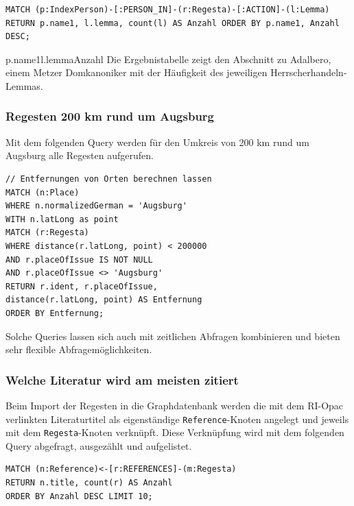 \begin{verbatim}
MATCH (p:IndexPerson)-[:PERSON_IN]-(r:Regesta)-[:ACTION]-(l:Lemma)
RETURN p.name1, l.lemma, count(l) AS Anzahl ORDER BY p.name1, Anzahl DESC;
\end{verbatim}

\textbar p.name1\textbar l.lemma\textbar Anzahl\textbar{} Die
Ergebnistabelle zeigt den Abschnitt zu Adalbero, einem Metzer
Domkanoniker mit der Häufigkeit des jeweiligen Herrscherhandeln-Lemmas.

\hypertarget{regesten-200-km-rund-um-augsburg}{%
\subsubsection{Regesten 200 km rund um
Augsburg}\label{regesten-200-km-rund-um-augsburg}}

Mit dem folgenden Query werden für den Umkreis von 200 km rund um
Augsburg alle Regesten aufgerufen.

\begin{verbatim}
// Entfernungen von Orten berechnen lassen
MATCH (n:Place)
WHERE n.normalizedGerman = 'Augsburg'
WITH n.latLong as point
MATCH (r:Regesta)
WHERE distance(r.latLong, point) < 200000
AND r.placeOfIssue IS NOT NULL
AND r.placeOfIssue <> 'Augsburg'
RETURN r.ident, r.placeOfIssue,
distance(r.latLong, point) AS Entfernung
ORDER BY Entfernung;
\end{verbatim}

Solche Queries lassen sich auch mit zeitlichen Abfragen kombinieren und
bieten sehr flexible Abfragemöglichkeiten.

\hypertarget{welche-literatur-wird-am-meisten-zitiert}{%
\subsubsection{Welche Literatur wird am meisten
zitiert}\label{welche-literatur-wird-am-meisten-zitiert}}

Beim Import der Regesten in die Graphdatenbank werden die mit dem
RI-Opac verlinkten Literaturtitel als eigenständige
\texttt{Reference}-Knoten angelegt und jeweils mit dem
\texttt{Regesta}-Knoten verknüpft. Diese Verknüpfung wird mit dem
folgenden Query abgefragt, ausgezählt und aufgelistet.

\begin{verbatim}
MATCH (n:Reference)<-[r:REFERENCES]-(m:Regesta)
RETURN n.title, count(r) AS Anzahl
ORDER BY Anzahl DESC LIMIT 10;
\end{verbatim}

